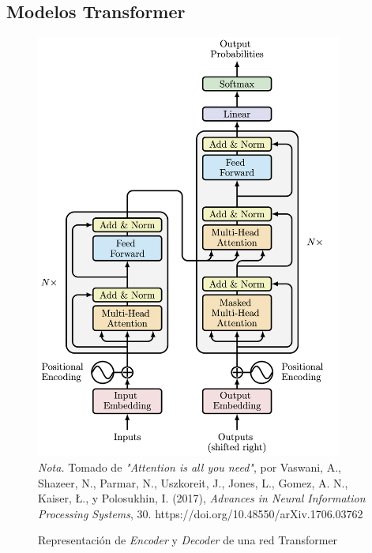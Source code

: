                 
        \subsection{Modelos Transformer}
        \begin{figure}[htbp]
          \centering
          \caption{Representación de \textit{Encoder} y \textit{Decoder} de una red Transformer}
          \includegraphics[width=0.9\textwidth]{figures/transformer.png}
          \label{fig:figura_transformer}
          \\
          \vspace{0.5cm}
          \textit{Nota.} Tomado de \textit{"Attention is all you need"}, por Vaswani, A., Shazeer, N., Parmar, N., Uszkoreit, J., Jones, L., Gomez, A. N., Kaiser, Ł., y Polosukhin, I. (2017), \textit{Advances in Neural Information Processing Systems}, 30. https://doi.org/10.48550/arXiv.1706.03762

        \end{figure}
        
